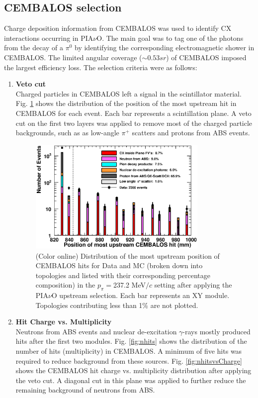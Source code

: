 \subsection{CEMBALOS selection}
Charge deposition information from CEMBALOS was used to identify CX interactions occurring in PIA$\nu$O. The main goal was to tag one of the photons from the decay of a $\pi^0$ by identifying the corresponding electromagnetic shower in CEMBALOS. The limited angular coverage ($\sim0.53 sr$) of CEMBALOS imposed the largest efficiency loss. The selection criteria were as follows:
\begin{enumerate}
\item{\bf Veto cut\\}
Charged particles in CEMBALOS left a signal in the scintillator material. Fig. \ref{fig:veto} shows the distribution of the position of the most upstream hit in CEMBALOS for each event. Each bar represents a scintillation plane. A veto cut on the first two layers was applied to remove most of the charged particle backgrounds, such as as low-angle $\pi^+$ scatters and protons from ABS events.

\begin{figure}[ht]
 \includegraphics[width=86mm]{figures/duettag_fgdMostUp_10000_forpaper_v3.eps}
 \caption{(Color online) Distribution of the most upstream position of CEMBALOS hits for Data and MC {\color{red}(broken down into topologies and listed with their corresponding percentage composition)} in the $p_\pi=$237.2 MeV$/c$ setting after applying the PIA$\nu$O upstream selection. Each bar represents an XY module. Topologies contributing less than 1\% are not plotted.}
 \label{fig:veto}
\end{figure}
   
\item{\bf Hit Charge vs. Multiplicity\\}
Neutrons from ABS events and nuclear de-excitation $\gamma$-rays mostly produced hits after the first two modules. Fig. \ref{fig:nhits} shows the distribution of the number of hits (multiplicity) in CEMBALOS. A minimum of five hits was required to reduce background from these sources. Fig. \ref{fig:nhitsvsCharge} shows the CEMBALOS hit charge vs. multiplicity distribution after applying the veto cut. A diagonal cut in this plane was applied to further reduce the remaining background of neutrons from ABS.
\end{enumerate}

